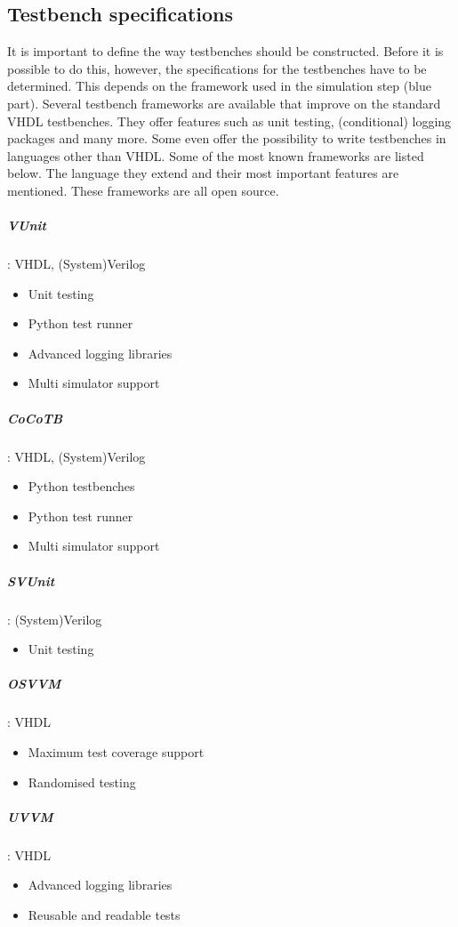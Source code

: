 \subsection{Testbench specifications}
It is important to define the way testbenches should be constructed. Before it is possible to do this, however, the specifications for the testbenches have to be determined. This depends on the framework used in the simulation step (blue part). Several testbench frameworks are available that improve on the standard VHDL testbenches. They offer features such as unit testing, (conditional) logging packages and many more. Some even offer the possibility to write testbenches in languages other than VHDL.
\npar
Some of the most known frameworks are listed below. The language they extend and their most important features are mentioned. These frameworks are all open source.
\subparagraph{VUnit}: VHDL, (System)Verilog
\begin{itemize}
	\setlength\itemsep{.1em}
	\item Unit testing
	\item Python test runner
	\item Advanced logging libraries
	\item Multi simulator support
\end{itemize}
\subparagraph{CoCoTB}: VHDL, (System)Verilog
\begin{itemize}
	\setlength\itemsep{.1em}
	\item Python testbenches
	\item Python test runner
	\item Multi simulator support	
\end{itemize}
\subparagraph{SVUnit}\cite{svunit}: (System)Verilog
\begin{itemize}
	\setlength\itemsep{.1em}
	\item Unit testing
\end{itemize}
\subparagraph{OSVVM}\cite{osvvm}: VHDL
\begin{itemize}
	\setlength\itemsep{.1em}
	\item Maximum test coverage support
	\item Randomised testing
\end{itemize}
\subparagraph{UVVM}\cite{uvvm}: VHDL
\begin{itemize}
	\setlength\itemsep{.1em}
	\item Advanced logging libraries
	\item Reusable and readable tests
\end{itemize}\noindent
